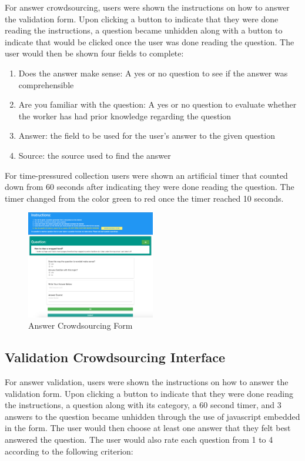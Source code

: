 \documentclass[11pt,letterpaper]{article}
\begin{document}
For answer crowdsourcing, users were shown the instructions on how to answer the validation form. Upon clicking a button to indicate that they were done reading the instructions, a question became unhidden along with a button to indicate that would be clicked once the user was done reading the question. The user would then be shown four fields to complete:

\begin{enumerate}
\item Does the answer make sense: A yes or no question to see if the answer was comprehensible 
\item Are you familiar with the question: A yes or no question to evaluate whether the worker has had prior knowledge regarding the question
\item Answer: the field to be used for the user's answer to the given question
\item Source: the source used to find the answer
\end{enumerate}

For time-pressured collection users were shown an artificial timer that counted down from 60 seconds after indicating they were done reading the question. The timer changed from the color green to red once the timer reached 10 seconds.

\begin{figure}[h]
\centering
\includegraphics[width=0.5\textwidth]{img/answering_screenshot}
\caption{Answer Crowdsourcing Form}
\label{fig:validation_form}
\end{figure}

\subsection{Validation Crowdsourcing Interface}
\label{subsec:interface}

For answer validation, users were shown the instructions on how to answer the validation form. Upon clicking a button to indicate that they were done reading the instructions, a question along with its category, a 60 second timer, and 3 answers to the question became unhidden through the use of javascript embedded in the form. The user would then choose at least one answer that they felt best answered the question. The user would also rate each question from 1 to 4 according to the following criterion:
\end{document}

